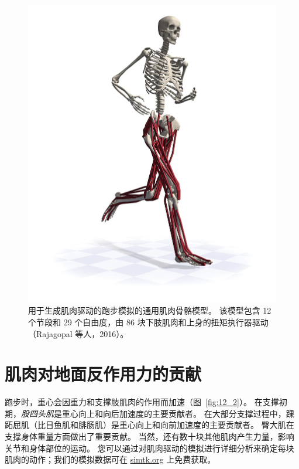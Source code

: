 \begin{figure}[!htb]
	\centering
	\includegraphics[width=1.0\linewidth]{chap12/12_1}
	\caption{用于生成肌肉驱动的跑步模拟的通用肌肉骨骼模型。
		该模型包含 12 个节段和 29 个自由度，由 86 块下肢肌肉和上身的扭矩执行器驱动（Rajagopal 等人，2016）。 \label{fig:12_1}}
\end{figure}


\section{肌肉对地面反作用力的贡献}

跑步时，重心会因重力和支撑肢肌肉的作用而加速（图~\ref{fig:12_2}）。
在支撑初期，\textit{股四头肌}是重心向上和向后加速度的主要贡献者。
在大部分支撑过程中，踝跖屈肌（比目鱼肌和腓肠肌）是重心向上和向前加速度的主要贡献者。
臀大肌在支撑身体重量方面做出了重要贡献。
当然，还有数十块其他肌肉产生力量，影响关节和身体部位的运动。
您可以通过对肌肉驱动的模拟进行详细分析来确定每块肌肉的动作；我们的模拟数据可在 \href{simtk.org}{simtk.org} 上免费获取。


